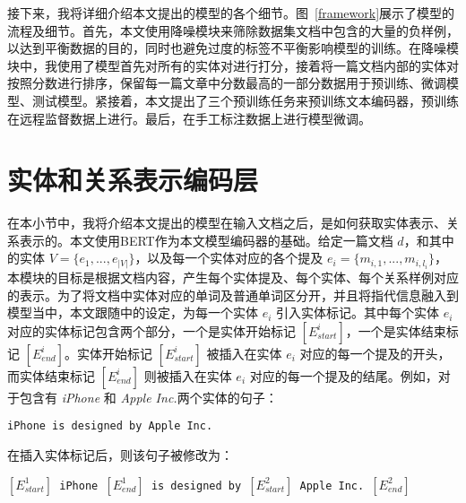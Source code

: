 接下来，我将详细介绍本文提出的模型的各个细节。图~\ref{framework}展示了模型的流程及细节。首先，本文使用降噪模块来筛除数据集文档中包含的大量的负样例，以达到平衡数据的目的，同时也避免过度的标签不平衡影响模型的训练。在降噪模块中，我使用了模型首先对所有的实体对进行打分，接着将一篇文档内部的实体对按照分数进行排序，保留每一篇文章中分数最高的一部分数据用于预训练、微调模型、测试模型。紧接着，本文提出了三个预训练任务来预训练文本编码器，预训练在远程监督数据上进行。最后，在手工标注数据上进行模型微调。





\section{实体和关系表示编码层}

在本小节中，我将介绍本文提出的模型在输入文档之后，是如何获取实体表示、关系表示的。本文使用BERT作为本文模型编码器的基础。给定一篇文档 $d$，和其中的实体 $V = \{e_1, ..., e_{|V|}\}$，以及每一个实体对应的各个提及 $e_i = \{m_{i,1}, ..., m_{i, l_i}\}$，本模块的目标是根据文档内容，产生每个实体提及、每个实体、每个关系样例对应的表示。为了将文档中实体对应的单词及普通单词区分开，并且将指代信息融入到模型当中，本文跟随\citet{soares2019matching}中的设定，为每一个实体 $e_i$ 引入实体标记。其中每个实体 $e_i$ 对应的实体标记包含两个部分，一个是实体开始标记 $[E_{start}^i]$，一个是实体结束标记 $[E_{end}^i]$。实体开始标记 $[E_{start}^i]$ 被插入在实体 $e_i$ 对应的每一个提及的开头，而实体结束标记 $[E_{end}^i]$ 则被插入在实体 $e_i$ 对应的每一个提及的结尾。例如，对于包含有 \emph{iPhone} 和 \emph{Apple Inc.}两个实体的句子：

\texttt{iPhone is designed by Apple Inc.}

在插入实体标记后，则该句子被修改为：

\texttt{$[E_{start}^1]$ iPhone $[E_{end}^1]$ is designed by $[E_{start}^2]$ Apple Inc. $[E_{end}^2]$} 

